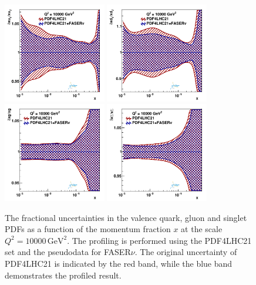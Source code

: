 \begin{figure}[H]
\centering
\includegraphics[width=0.4\textwidth]{./figs_xFitter/FASERv_q2_10000_pdf_uv_ratio.pdf}
\includegraphics[width=0.4\textwidth]{./figs_xFitter/FASERv_q2_10000_pdf_dv_ratio.pdf}\\
\includegraphics[width=0.4\textwidth]{./figs_xFitter/FASERv_q2_10000_pdf_g_ratio.pdf}
\includegraphics[width=0.4\textwidth]{./figs_xFitter/FASERv_q2_10000_pdf_Sea_ratio.pdf}
\caption{The fractional uncertainties in the valence quark, gluon and singlet PDFs as a function of the momentum fraction $x$ at the scale $Q^2 = 10000 \, \textrm{GeV}^2$. The profiling is performed using the
PDF4LHC21 set and the pseudodata for FASER$\nu$. The original uncertainty of PDF4LHC21 is
indicated by the red band, while the blue band demonstrates the profiled result.}
\label{FASERv_profiling}
\end{figure}


